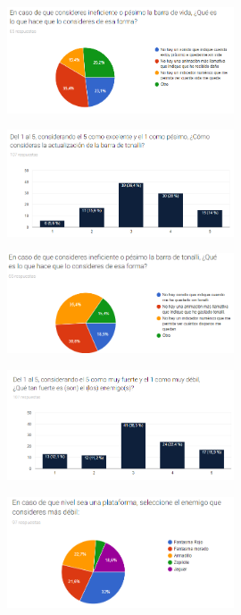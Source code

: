 \begin{figure}[H]
    \centering
    \includegraphics[width=0.6\textwidth]{Anexos/respuestas/grafica14.png}
\end{figure}

\begin{figure}[H]
    \centering
    \includegraphics[width=0.6\textwidth]{Anexos/respuestas/grafica15.png}
\end{figure}

\begin{figure}[H]
    \centering
    \includegraphics[width=0.6\textwidth]{Anexos/respuestas/grafica16.png}
\end{figure}

\begin{figure}[H]
    \centering
    \includegraphics[width=0.6\textwidth]{Anexos/respuestas/grafica17.png}
\end{figure}

\begin{figure}[H]
    \centering
    \includegraphics[width=0.6\textwidth]{Anexos/respuestas/grafica18.png}
\end{figure}

